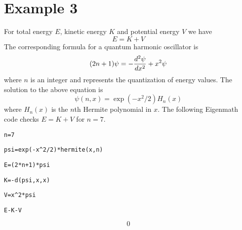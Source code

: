 
\newpage

\section*{Example 3}

For total energy $E$, kinetic energy $K$ and potential energy $V$ we have
$$E=K+V$$
The corresponding formula for a quantum harmonic oscillator is
$$(2n+1)\psi=-{d^2\psi\over dx^2}+x^2\psi$$
where $n$ is an integer and represents the quantization of energy values.
The solution to the above equation is
$$\psi(n,x)=\exp(-x^2/2)H_n(x)$$
where $H_n(x)$ is the $n$th Hermite polynomial in $x$.
The following Eigenmath code checks $E=K+V$ for $n=7$.

\medskip
\verb$n=7$

\verb$psi=exp(-x^2/2)*hermite(x,n)$

\verb$E=(2*n+1)*psi$

\verb$K=-d(psi,x,x)$

\verb$V=x^2*psi$

\verb$E-K-V$

$$0$$

